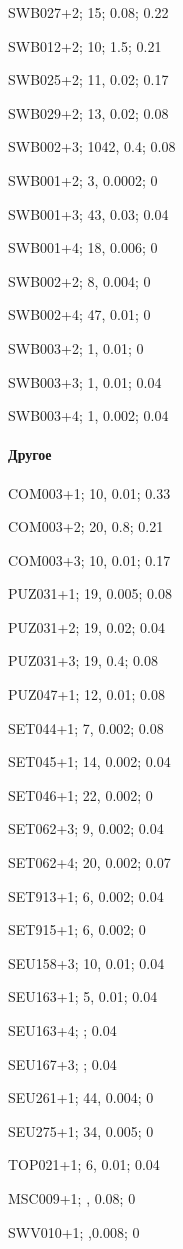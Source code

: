 SWB027+2; 15; 0.08; 0.22

SWB012+2; 10; 1.5; 0.21

SWB025+2; 11, 0.02; 0.17

SWB029+2; 13, 0.02; 0.08

SWB002+3; 1042, 0.4; 0.08

SWB001+2; 3, 0.0002; 0

SWB001+3; 43, 0.03; 0.04

SWB001+4; 18, 0.006; 0

SWB002+2; 8, 0.004; 0

SWB002+4; 47, 0.01; 0

SWB003+2; 1, 0.01; 0

SWB003+3; 1, 0.01; 0.04

SWB003+4; 1, 0.002; 0.04


\paragraph{Другое}

COM003+1; 10, 0.01; 0.33

COM003+2; 20, 0.8; 0.21

COM003+3; 10, 0.01; 0.17

PUZ031+1; 19, 0.005; 0.08

PUZ031+2; 19, 0.02; 0.04

PUZ031+3; 19, 0.4; 0.08

PUZ047+1; 12, 0.01; 0.08

SET044+1; 7, 0.002; 0.08

SET045+1; 14, 0.002; 0.04

SET046+1; 22, 0.002; 0

SET062+3; 9, 0.002; 0.04

SET062+4; 20, 0.002; 0.07

SET913+1; 6, 0.002; 0.04

SET915+1; 6, 0.002; 0

SEU158+3; 10, 0.01; 0.04

SEU163+1; 5, 0.01; 0.04

SEU163+4; ; 0.04

SEU167+3; ; 0.04

SEU261+1; 44, 0.004; 0

SEU275+1; 34, 0.005; 0

TOP021+1; 6, 0.01; 0.04

MSC009+1; , 0.08; 0

SWV010+1; ,0.008; 0

